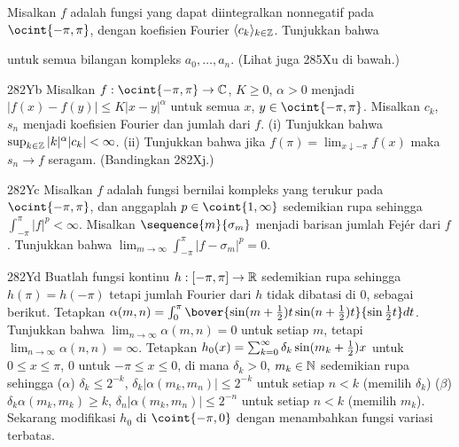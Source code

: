 {
Misalkan $f$ adalah fungsi yang dapat diintegralkan nonnegatif pada
$\ocint{-\pi,\pi}$, dengan koefisien Fourier
$\langle c_k\rangle_{k\in\Bbb Z}$.   Tunjukkan bahwa


\noindent untuk semua bilangan kompleks $a_0,\ldots,a_n$.   (Lihat juga 285Xu
di bawah.)

\spheader 282Yb Misalkan $f:\ocint{-\pi,\pi}\to\Bbb C$, $K\ge 0$, $\alpha>0$
menjadi $|f(x)-f(y)|\le K|x-y|^{\alpha}$ untuk semua $x$,
$y\in\ocint{-\pi,\pi}$.   Misalkan $c_k$, $s_n$ menjadi koefisien Fourier
dan jumlah dari $f$.   (i) Tunjukkan bahwa
$\sup_{k\in\Bbb Z}|k|^{\alpha}|c_k|<\infty$.      (ii) Tunjukkan bahwa jika $f(\pi)=\lim_{x\downarrow-\pi}f(x)$
maka $s_n\to f$ seragam.   (Bandingkan 282Xj.)

\spheader 282Yc Misalkan $f$ adalah fungsi bernilai kompleks
yang terukur pada $\ocint{-\pi,\pi}$, dan anggaplah
$p\in\coint{1,\infty}$ sedemikian rupa sehingga
$\int_{-\pi}^{\pi}|f|^p<\infty$.   Misalkan
$\sequence{m}{\sigma_m}$ menjadi barisan jumlah Fej\'er dari $f$.   Tunjukkan
bahwa $\lim_{m\to\infty}\int_{-\pi}^{\pi}|f-\sigma_m|^p=0$.

\spheader 282Yd Buatlah fungsi kontinu
$h:[-\pi,\pi]\to\Bbb R$ sedemikian rupa sehingga $h(\pi)=h(-\pi)$ tetapi jumlah Fourier
dari $h$ tidak dibatasi di $0$, sebagai berikut.   Tetapkan
$\alpha(m,n)=\int_0^{\pi}
\bover{\sin(m+{1\over2})t\sin(n+{1\over 2})t}{\sin{1\over 2}t}dt$.
Tunjukkan bahwa $\lim_{n\to\infty}\alpha(m,n)=0$
untuk setiap $m$, tetapi $\lim_{n\to\infty}\alpha(n,n)=\infty$.   Tetapkan
$h_0(x)=\sum_{k=0}^{\infty}\delta_k\sin(m_k+{1\over 2})x$ untuk
$0\le x\le\pi$, $0$ untuk $-\pi\le x\le 0$, di mana
$\delta_k>0$, $m_k\in\Bbb N$ sedemikian rupa sehingga
($\alpha$) $\delta_k\le 2^{-k}$, $\delta_k|\alpha(m_k,m_n)|\le 2^{-k}$
untuk setiap $n<k$ (memilih $\delta_k$) ($\beta$)
$\delta_k\alpha(m_k,m_k)\ge k$, $\delta_n|\alpha(m_k,m_n)|\le 2^{-n}$
untuk setiap $n<k$ (memilih
$m_k$).   Sekarang modifikasi $h_0$ di $\coint{-\pi,0}$ dengan menambahkan fungsi variasi terbatas.

}
